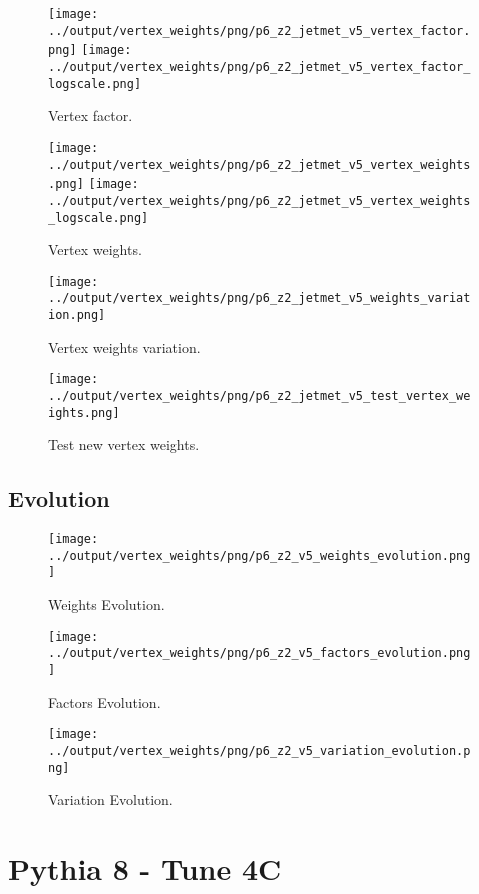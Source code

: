 \documentclass[11pt]{book}
\begin{document}
\begin{figure}[ht]
\centering
\texttt{[image: ../output/vertex\_weights/png/p6\_z2\_jetmet\_v5\_vertex\_factor.png]}
\texttt{[image: ../output/vertex\_weights/png/p6\_z2\_jetmet\_v5\_vertex\_factor\_logscale.png]}
\caption{Vertex factor.}
\end{figure}

\begin{figure}[ht]
\centering
\texttt{[image: ../output/vertex\_weights/png/p6\_z2\_jetmet\_v5\_vertex\_weights.png]}
\texttt{[image: ../output/vertex\_weights/png/p6\_z2\_jetmet\_v5\_vertex\_weights\_logscale.png]}
\caption{Vertex weights.}
\end{figure}

\begin{figure}[ht]
\centering
\texttt{[image: ../output/vertex\_weights/png/p6\_z2\_jetmet\_v5\_weights\_variation.png]}
\caption{Vertex weights variation.}
\end{figure}

\begin{figure}[ht]
\centering
\texttt{[image: ../output/vertex\_weights/png/p6\_z2\_jetmet\_v5\_test\_vertex\_weights.png]}
\caption{Test new vertex weights.}
\end{figure}
\clearpage

\subsection{Evolution}
\begin{figure}[ht]
\centering
\texttt{[image: ../output/vertex\_weights/png/p6\_z2\_v5\_weights\_evolution.png]}
\caption{Weights Evolution.}
\end{figure}


\begin{figure}[ht]
\centering
\texttt{[image: ../output/vertex\_weights/png/p6\_z2\_v5\_factors\_evolution.png]}
\caption{Factors Evolution.}
\end{figure}

\begin{figure}[ht]
\centering
\texttt{[image: ../output/vertex\_weights/png/p6\_z2\_v5\_variation\_evolution.png]}
\caption{Variation Evolution.}
\end{figure}
\clearpage


\section{Pythia 8 - Tune 4C}
\end{document}
